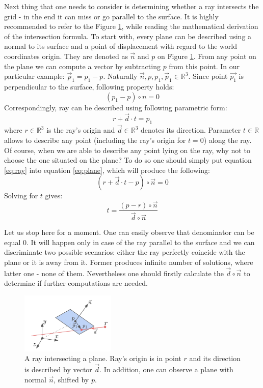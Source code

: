 \documentclass{report}
\begin{document}
Next thing that one needs to consider is determining whether a ray intersects the grid - in the end it can miss or go parallel to the surface. It is highly recommended to refer to the Figure \ref{fig:ray_intersect}, while reading the mathematical derivation of the intersection formula. To start with, every plane can be described using a normal to its surface and a point of displacement with regard to the world coordinates origin. They are denoted as $\vec{n}$ and $p$ on Figure \ref{fig:ray_intersect}. From any point on the plane we can compute a vector by subtracting $p$ from this point. In our particular example: $\vec{p}_1 = p_1 - p$. Naturally $\vec{n}, p, p_1, \vec{p}_1  \in \mathbb{R}^3$. Since point $\vec{p_1}$ is perpendicular to the surface, following property holds:
\begin{equation} \label{eq:plane}
(p_1 - p) \circ n = 0
\end{equation}
Correspondingly, ray can be described using following parametric form:
\begin{equation} \label{eq:ray}
r + \vec{d} \cdot t = p_1
\end{equation}
where $r \in \mathbb{R}^3$ is the ray's origin and $\vec{d} \in \mathbb{R}^3$ denotes its direction. Parameter $t \in \mathbb{R}$ allows to describe any point (including the ray's origin for $t=0$) along the ray. Of course, when we are able to describe any point lying on the ray, why not to choose the one situated on the plane? To do so one should simply put equation \ref{eq:ray} into equation \ref{eq:plane}, which will produce the following:
\begin{equation}
(r + \vec{d} \cdot t - p) \circ \vec{n} = 0
\end{equation}
Solving for $t$ gives:
\begin{equation}
t = \frac{(p - r) \circ \vec{n}}{\vec{d} \circ \vec{n}}
\end{equation}

Let us stop here for a moment. One can easily observe that denominator can be equal $0$. It will happen only in case of the ray parallel to the surface and we can discriminate two possible scenarios: either the ray perfectly coincide with the plane or it is away from it. Former produces infinite number of solutions, where latter one - none of them. Nevertheless one should firstly calculate the $\vec{d} \circ \vec{n}$ to determine if further computations are needed.

\begin{figure}[H] 
    \centering
    \includegraphics[width=0.4\textwidth]{images/ray_intersect.pdf}
    \caption{A ray intersecting a plane. Ray's origin is in point $r$ and its direction is described by vector $\vec{d}$. In addition, one can observe a plane with normal $\vec{n}$, shifted by $p$.}
    \label{fig:ray_intersect}
\end{figure}
\end{document}
